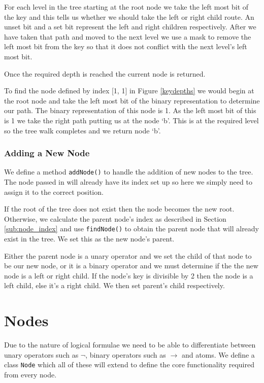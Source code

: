 \documentclass{report}
\begin{document}
For each level in the tree starting at the root node we take the left most bit of the key and this tells us whether we should take the left or right child route. An unset bit and a set bit represent the left and right children respectively. After we have taken that path and moved to the next level we use a mask to remove the left most bit from the key so that it does not conflict with the next level's left most bit.

Once the required depth is reached the current node is returned.

To find the node defined by index [1, 1] in Figure \ref{keydepths} we would begin at the root node and take the left most bit of the binary representation to determine our path. The binary representation of this node is 1. As the left most bit of this is 1 we take the right path putting us at the node `b'. This is at the required level so the tree walk completes and we return node `b'.

\subsubsection{Adding a New Node}

We define a method {\tt addNode()} to handle the addition of new nodes to the tree. The node passed in will already have its index set up so here we simply need to assign it to the correct position.

If the root of the tree does not exist then the node becomes the new root. Otherwise, we calculate the parent node's index as described in Section \ref{sub:node_index} and use {\tt findNode()} to obtain the parent node that will already exist in the tree. We set this as the new node's parent.

Either the parent node is a unary operator and we set the child of that node to be our new node, or it is a binary operator and we must determine if the the new node is a left or right child. If the node's key is divisible by 2 then the node is a left child, else it's a right child. We then set parent's child respectively. 

\section{Nodes}

Due to the nature of logical formulae we need to be able to differentiate between unary operators such as $\lnot$, binary operators such as $\to$ and atoms. We define a class {\tt Node} which all of these will extend to define the core functionality required from every node.
\end{document}
